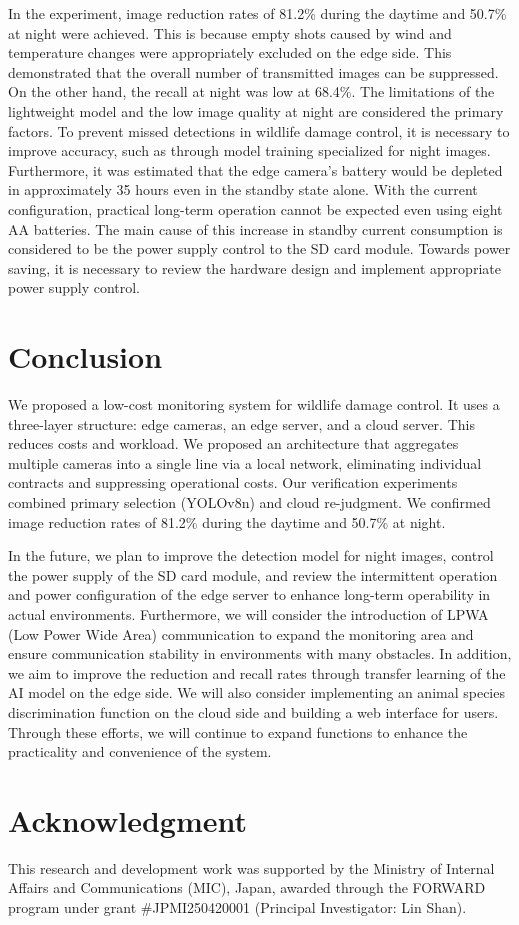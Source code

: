\documentclass[conference]{IEEEtran}
\begin{document}
In the experiment, image reduction rates of 81.2\% during the daytime and 50.7\% at night were achieved. This is because empty shots caused by wind and temperature changes were appropriately excluded on the edge side. This demonstrated that the overall number of transmitted images can be suppressed. On the other hand, the recall at night was low at 68.4\%. The limitations of the lightweight model and the low image quality at night are considered the primary factors. To prevent missed detections in wildlife damage control, it is necessary to improve accuracy, such as through model training specialized for night images. Furthermore, it was estimated that the edge camera's battery would be depleted in approximately 35 hours even in the standby state alone. With the current configuration, practical long-term operation cannot be expected even using eight AA batteries. The main cause of this increase in standby current consumption is considered to be the power supply control to the SD card module. Towards power saving, it is necessary to review the hardware design and implement appropriate power supply control.

\section{Conclusion}
We proposed a low-cost monitoring system for wildlife damage control. It uses a three-layer structure: edge cameras, an edge server, and a cloud server. This reduces costs and workload. We proposed an architecture that aggregates multiple cameras into a single line via a local network, eliminating individual contracts and suppressing operational costs. Our verification experiments combined primary selection (YOLOv8n) and cloud re-judgment. We confirmed image reduction rates of 81.2\% during the daytime and 50.7\% at night.

In the future, we plan to improve the detection model for night images, control the power supply of the SD card module, and review the intermittent operation and power configuration of the edge server to enhance long-term operability in actual environments. Furthermore, we will consider the introduction of LPWA (Low Power Wide Area) communication to expand the monitoring area and ensure communication stability in environments with many obstacles. In addition, we aim to improve the reduction and recall rates through transfer learning of the AI model on the edge side. We will also consider implementing an animal species discrimination function on the cloud side and building a web interface for users. Through these efforts, we will continue to expand functions to enhance the practicality and convenience of the system.



\section*{Acknowledgment}

This research and development work was supported by the Ministry of Internal Affairs and Communications (MIC), Japan, awarded through the FORWARD program under grant \#JPMI250420001 (Principal Investigator: Lin Shan).



\end{document}

